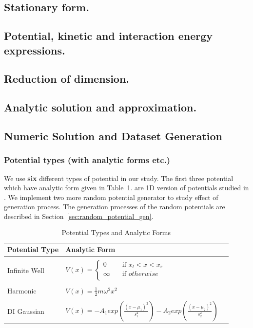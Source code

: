\documentclass[a4paper,times,12pt]{article}
\begin{document}
\subsection{Stationary form.}
\subsection{Potential, kinetic and interaction energy expressions.}
\subsection{Reduction of dimension.}
\subsection{Analytic solution and approximation.}

\subsection{Numeric Solution and Dataset Generation}
\subsubsection{Potential types (with analytic forms etc.)}

We use \textbf{six} different types of potential in our study. The first three potential which have analytic form given in Table~\ref{tb:analytic_pot_types}. are 1D version of potentials studied in \cite{mills2017deep}. We implement two more random potential generator to study effect of generation process. The generation processes of the random potentials are described in Section~\ref{sec:random_potential_gen}.

\newcommand{\infinitewell}{$
V(x) = 
    \begin{cases}
       0 &\quad\text{if } x_l < x < x_r  \\
       \infty &\quad\text{if } otherwise \\
    \end{cases}
$}

\newcommand{\harmonicpot}{$ V(x) =  \frac{1}{2}m \omega^2 x^2 $}

\newcommand{\gaussianpot}{$ V(x) = -A_1 exp(\frac{(x - \mu_1)^2}{s_1^2}) -A_2 exp(\frac{(x - \mu_2)^2}{s_2^2})  $
}



\begin{table}[H]
\centering
\caption{Potential Types and Analytic Forms}
\begin{tabular}{l | ll}
    Potential Type  & Analytic Form  & \\  \hline \\
    Infinite Well   & \infinitewell  &  \\[0.7cm] \hline \\
    Harmonic        & \harmonicpot   &  \\[0.7cm] \hline \\
    DI Gaussian     & \gaussianpot   & \\[0.7cm] \hline
\end{tabular}
\label{tb:analytic_pot_types}
\end{table}
\end{document}

